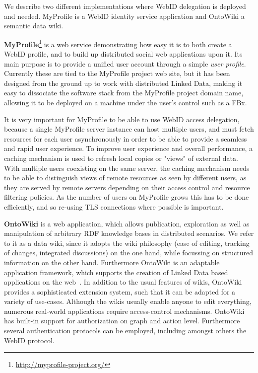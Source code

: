 \documentclass[a4paper]{llncs}
\begin{document}
We describe two different implementations where WebID delegation is deployed and needed.
MyProfile is a WebID identity service application and OntoWiki a semantic data wiki.

\textbf{MyProfile}\footnote{\url{http://myprofile-project.org/}}
is a web service demonstrating how easy it is to both create a WebID profile, and to build up distributed social web applications upon it.
Its main purpose is to provide a unified user account through a simple \textit{user profile}.
Currently these are tied to the MyProfile project web site, but it has been designed from the ground up to work with distributed Linked Data, making it easy to dissociate the software stack from the MyProfile project domain name, allowing it to be deployed on a machine under the user's control such as a FBx.


It is very important for MyProfile to be able to use WebID access delegation, because a single MyProfile server instance can host multiple users, and must fetch resources for each user asynchronously in order to be able to provide a seamless and rapid user experience.
To improve user experience and overall performance, a caching mechanism is used to refresh local copies or "views" of external data.
With multiple users coexisting on the same server, the caching mechanism needs to be able to distinguish views of remote resources as seen by different users, as they are served by remote servers depending on their access control and resource filtering policies.
As the number of users on MyProfile grows this has to be done efficiently, and so re-using TLS connections where possible is important.

\textbf{OntoWiki}
\cite{auer-s-2006-736-a} is a web application, which allows publication, exploration as well as manipulation of arbitrary RDF knowledge bases in distributed scenarios.
We refer to it as a data wiki, since it adopts the wiki philosophy (ease of editing, tracking of changes, integrated discussions) on the one hand, while focussing on structured information on the other hand.
Furthermore OntoWiki is an adaptable application framework, which supports the creation of Linked Data based applications on the web~\cite{heino-n-2009-61-a}.
In addition to the usual features of wikis, OntoWiki provides a sophisticated extension system, such that it can be adapted for a variety of use-cases.
Although the wikis usually enable anyone to edit everything, numerous real-world applications require access-control mechanisms.
OntoWiki has built-in support for authorization on graph and action level.
Furthermore several authentication protocols can be employed, including amongst others the WebID protocol.
\end{document}
